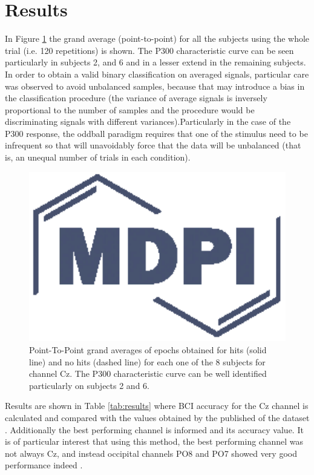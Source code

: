 \documentclass[entropy,article,submit,moreauthors,pdftex,10pt,a4paper]{mdpi}
\begin{document}
\section{Results}

In Figure \ref{fig:subjectaveraged} the grand average (point-to-point) for all the subjects using the whole trial (i.e. 120 repetitions) is shown.  The P300 characteristic curve can be seen particularly in subjects 2, and 6 and in a lesser extend in the remaining subjects. In order to obtain a valid binary classification on averaged signals, particular care was observed to avoid unbalanced samples, because that may introduce a bias in the classification procedure (the variance of average signals is inversely proportional to the number of samples and the procedure would be discriminating signals with different variances).Particularly in the case of the P300 response, the oddball paradigm requires that one of the stimulus need to be infrequent so that will unavoidably force that the data will be unbalanced (that is, an unequal number of trials in each condition).


\begin{figure}[H]
\centering
\includegraphics[width=16cm]{subjectaveraged.eps}
\caption{Point-To-Point grand averages of epochs obtained for hits (solid line) and no hits (dashed line) for each one of the 8 subjects for channel Cz. The P300 characteristic curve can be well identified particularly on subjects 2 and 6.}
\label{fig:subjectaveraged}
\end{figure}

Results are shown in Table \ref{tab:results} where BCI accuracy
for the Cz channel is calculated and compared with the values obtained by the published of the dataset  \citep{Riccio2013}.  Additionally the best performing channel is informed and its accuracy value.  It is of particular interest that using this method, the best performing channel was not always Cz, and instead occipital channels PO8 and PO7 showed very good performance indeed \citep{Huggins2016,Jure2016}.
\end{document}
